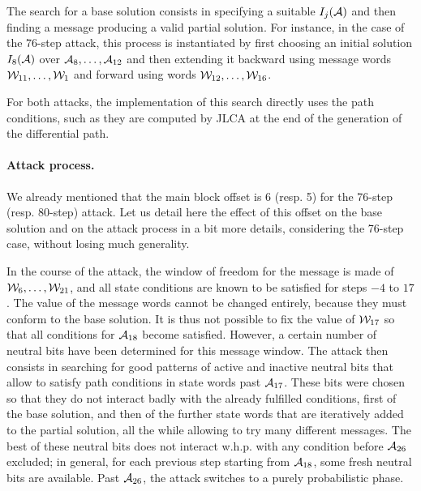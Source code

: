 The search for a base solution consists in specifying a suitable \iv $I_j(\mathcal{A})$ and then finding a message producing a valid partial solution. For instance, in the case of the 76-step
attack, this process is instantiated by first choosing an initial solution $I_8(\mathcal{A})$ over $\mathcal{A}_8,\ldots,\mathcal{A}_{12}$
and then extending it backward using message words $\mathcal{W}_{11},\ldots,\mathcal{W}_1$
and forward using words $\mathcal{W}_{12},\ldots,\mathcal{W}_{16}$.

For both attacks, the implementation of this search directly uses the path conditions, such as they are computed by JLCA at the end of the generation of the differential path.

\paragraph{Attack process.}
We already mentioned that the main block offset is 6 (resp. 5) for the 76-step (resp. 80-step) attack. Let us detail here the effect of this offset on the base solution and on the attack process
in a bit more details, considering the 76-step case, without losing much generality.

In the course of the attack, the window of freedom for the message is made of $\expmess_6,\ldots,\linebreak\expmess_{21}$, and all state conditions are known to be satisfied for steps $-4$ to $17$.
The value of the message words cannot be changed entirely, because they must conform to the base solution. It is thus not possible to \eg fix the value of $\mathcal{W}_{17}$ so that all conditions
for $\mathcal{A}_{18}$ become satisfied. However, a certain number of neutral bits have been determined for this message window. The attack then consists in searching for good patterns of active and
inactive neutral bits that allow to satisfy path conditions in state words past $\mathcal{A}_{17}$. These bits were chosen so that they do not interact badly with the already fulfilled conditions,
first of the base solution, and then of the further state words that are iteratively added to the partial solution, all the while allowing to try many different messages. The best of these neutral bits does not
interact w.h.p. with any condition before $\mathcal{A}_{26}$ excluded; in general, for each previous step starting from $\mathcal{A}_{18}$, some fresh neutral bits are available. Past $\mathcal{A}_{26}$,
the attack switches to a purely probabilistic phase.

